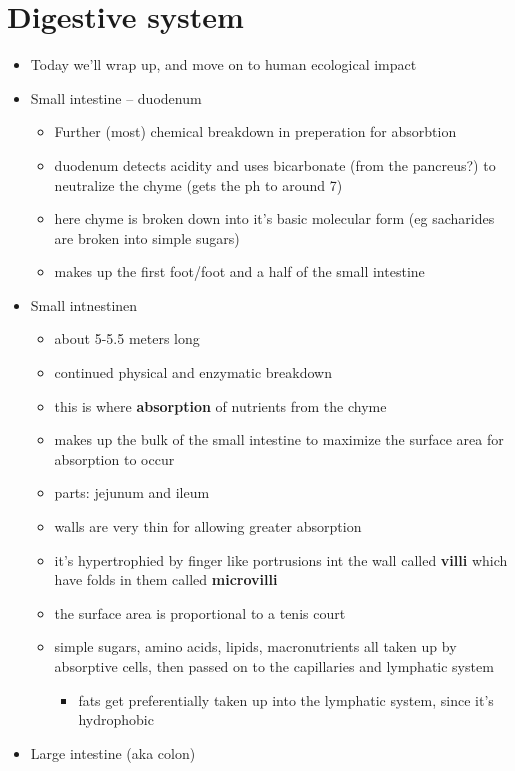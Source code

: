 \documentclass{article}
\theoremstyle{definition}
\begin{document}
\section{Digestive system}
\begin{itemize}
	\item Today we'll wrap up, and move on to human ecological impact
	\item Small intestine -- duodenum
		\begin{itemize}
			\item Further (most) chemical breakdown in preperation for absorbtion
			\item duodenum detects acidity and uses bicarbonate (from the pancreus?) to neutralize the chyme (gets the ph to around 7)
			\item here chyme is broken down into it's basic molecular form (eg sacharides are broken into simple sugars)
			\item makes up the first foot/foot and a half of the small intestine
		\end{itemize}
	\item Small intnestinen
		\begin{itemize}
			\item about 5-5.5 meters long
			\item continued physical and enzymatic breakdown
			\item this is where \textbf{absorption} of nutrients from the chyme
			\item makes up the bulk of the small intestine to maximize the surface area for absorption to occur
			\item parts: jejunum and ileum
			\item walls are very thin for allowing greater absorption
			\item it's hypertrophied by finger like portrusions int the wall called \textbf{villi} which have folds in them called \textbf{microvilli} 
			\item the surface area is proportional to a tenis court
			\item simple sugars, amino acids, lipids, macronutrients all taken up by absorptive cells, then passed on to the capillaries and lymphatic system
				\begin{itemize}
					\item fats get preferentially taken up into the lymphatic system, since it's hydrophobic
				\end{itemize}
		\end{itemize}
	\item Large intestine (aka colon)

\end{itemize}
\end{document}

